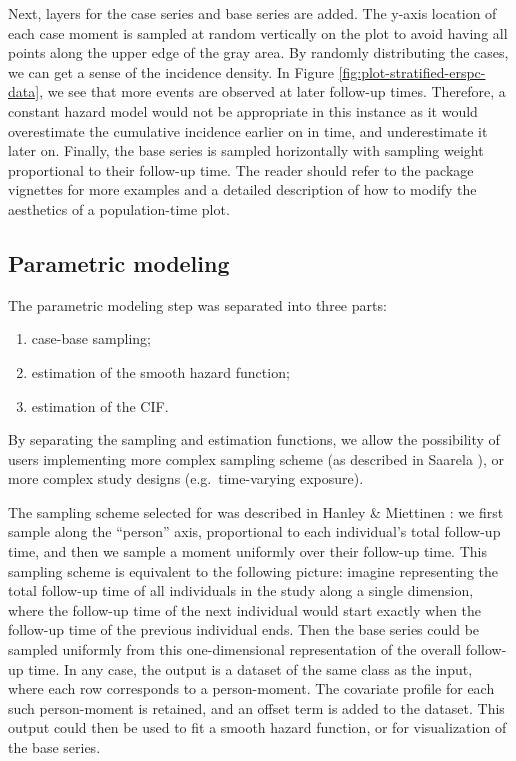 \documentclass[
]{jss}
\providecommand{\tightlist}{%
  \setlength{\itemsep}{0pt}\setlength{\parskip}{0pt}}
\begin{document}
Next, layers for the case series and base series are added. The y-axis
location of each case moment is sampled at random vertically on the plot
to avoid having all points along the upper edge of the gray area. By
randomly distributing the cases, we can get a sense of the incidence
density. In Figure \ref{fig:plot-stratified-erspc-data}, we see that
more events are observed at later follow-up times. Therefore, a constant
hazard model would not be appropriate in this instance as it would
overestimate the cumulative incidence earlier on in time, and
underestimate it later on. Finally, the base series is sampled
horizontally with sampling weight proportional to their follow-up time.
The reader should refer to the package vignettes for more examples and a
detailed description of how to modify the aesthetics of a
population-time plot.

\hypertarget{parametric-modeling}{%
\subsection{Parametric modeling}\label{parametric-modeling}}

The parametric modeling step was separated into three parts:

\begin{enumerate}
\def\labelenumi{\arabic{enumi}.}
\tightlist
\item
  case-base sampling;
\item
  estimation of the smooth hazard function;
\item
  estimation of the CIF.
\end{enumerate}

By separating the sampling and estimation functions, we allow the
possibility of users implementing more complex sampling scheme (as
described in Saarela \citeyearpar{saarela2016case}), or more complex
study designs (e.g.~time-varying exposure).

The sampling scheme selected for  was described in
Hanley \& Miettinen \citeyearpar{hanley2009fitting}: we first sample
along the ``person'' axis, proportional to each individual's total
follow-up time, and then we sample a moment uniformly over their
follow-up time. This sampling scheme is equivalent to the following
picture: imagine representing the total follow-up time of all
individuals in the study along a single dimension, where the follow-up
time of the next individual would start exactly when the follow-up time
of the previous individual ends. Then the base series could be sampled
uniformly from this one-dimensional representation of the overall
follow-up time. In any case, the output is a dataset of the same class
as the input, where each row corresponds to a person-moment. The
covariate profile for each such person-moment is retained, and an offset
term is added to the dataset. This output could then be used to fit a
smooth hazard function, or for visualization of the base series.
\end{document}
